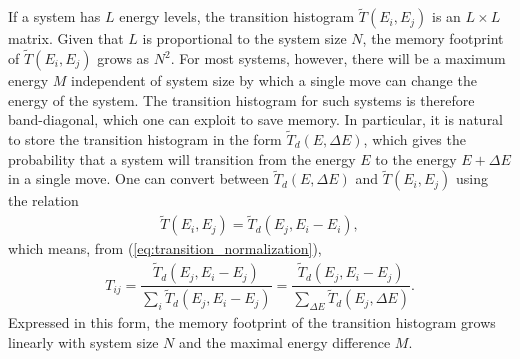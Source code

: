 \documentclass[11pt]{article}
\newcommand{\f}[2]{\dfrac{#1}{#2}} %
\newcommand{\p}[1]{\left(#1\right)} %
\begin{document}
If a system has $L$ energy levels, the transition histogram $\tilde
T\p{E_i,E_j}$ is an $L\times L$ matrix. Given that $L$ is proportional
to the system size $N$, the memory footprint of $\tilde T\p{E_i,E_j}$
grows as $N^2$. For most systems, however, there will be a maximum
energy $M$ independent of system size by which a single move can
change the energy of the system. The transition histogram for such
systems is therefore band-diagonal, which one can exploit to save
memory. In particular, it is natural to store the transition histogram
in the form $\tilde T_d\p{E,\Delta E}$, which gives the probability
that a system will transition from the energy $E$ to the energy
$E+\Delta E$ in a single move. One can convert between $\tilde
T_d\p{E,\Delta E}$ and $\tilde T\p{E_i,E_j}$ using the relation
\begin{align}
  \tilde T\p{E_i,E_j}=\tilde T_d\p{E_j,E_i-E_i},
\end{align}
which means, from (\ref{eq:transition_normalization}),
\begin{align}
  T_{ij}=\f{\tilde T_d\p{E_j,E_i-E_j}}{\sum_i\tilde T_d\p{E_j,E_i-E_j}}
  =\f{\tilde T_d\p{E_j,E_i-E_j}}
  {\sum_{\Delta E}\tilde T_d\p{E_j,\Delta E}}.
  \label{eq:transition_conversion}
\end{align}
Expressed in this form, the memory footprint of the transition
histogram grows linearly with system size $N$ and the maximal energy
difference $M$.
\end{document}
